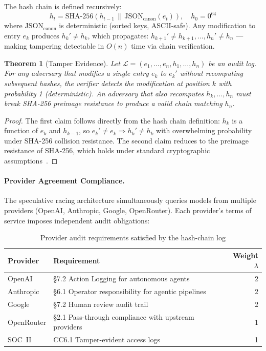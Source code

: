 \documentclass[11pt,twocolumn]{article}
\newtheorem{theorem}{Theorem}
\begin{document}
The hash chain is defined recursively:
\begin{equation}
  h_t = \text{SHA-256}\!\left(h_{t-1} \,\big\|\, \text{JSON}_{\text{canon}}(e_t)\right),
  \quad h_0 = 0^{64}
\end{equation}
where $\text{JSON}_{\text{canon}}$ is deterministic (sorted keys, ASCII-safe).
Any modification to entry $e_k$ produces $h_k' \neq h_k$, which propagates:
$h_{k+1}' \neq h_{k+1}, \ldots, h_n' \neq h_n$ — making tampering detectable
in $O(n)$ time via chain verification.

\begin{theorem}[Tamper Evidence]
\label{thm:tamper}
Let $\mathcal{L} = (e_1, \ldots, e_n, h_1, \ldots, h_n)$ be an audit log.
For any adversary that modifies a single entry $e_k$ to $e_k'$ without
recomputing subsequent hashes, the verifier detects the modification at
position $k$ with probability 1 (deterministic). An adversary that also
recomputes $h_k, \ldots, h_n$ must break SHA-256 preimage resistance to
produce a valid chain matching $h_n$.
\end{theorem}

\begin{proof}
The first claim follows directly from the hash chain definition: $h_k$ is a
function of $e_k$ and $h_{k-1}$, so $e_k' \neq e_k \Rightarrow h_k' \neq h_k$
with overwhelming probability under SHA-256 collision resistance. The second
claim reduces to the preimage resistance of SHA-256, which holds under standard
cryptographic assumptions~\cite{fips2015sha}.
\end{proof}

\paragraph{Provider Agreement Compliance.}
The speculative racing architecture simultaneously queries models from multiple
providers (OpenAI, Anthropic, Google, OpenRouter). Each provider's terms of service
imposes independent audit obligations:

\begin{table}[h]
\centering
\caption{Provider audit requirements satisfied by the hash-chain log}
\label{tab:provider-audit}
\begin{tabular}{llr}
\toprule
Provider & Requirement & Weight $\lambda$ \\
\midrule
OpenAI   & §7.2 Action Logging for autonomous agents & 2 \\
Anthropic & §6.1 Operator responsibility for agentic pipelines & 2 \\
Google   & §7.2 Human review audit trail & 2 \\
OpenRouter & §2.1 Pass-through compliance with upstream providers & 1 \\
SOC~II   & CC6.1 Tamper-evident access logs & 1 \\
\bottomrule
\end{tabular}
\end{table}
\end{document}
